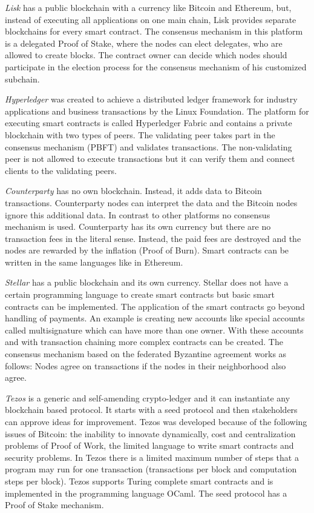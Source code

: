 \documentclass[conference]{IEEEtran}
\begin{document}
\textit{Lisk} has a public blockchain with a currency like Bitcoin and Ethereum, but, instead of executing all applications on one main chain, Lisk provides separate blockchains for every smart contract. The consensus mechanism in this platform is a delegated Proof of Stake, where the nodes can elect delegates, who are allowed to create blocks. The contract owner can decide which nodes should participate in the election process for the consensus mechanism of his customized subchain.  \cite{Bartoletti2017} \par 
\textit{Hyperledger} was created to achieve a distributed ledger framework for industry applications and business transactions by the Linux Foundation. The platform for executing smart contracts is called Hyperledger Fabric and contains a private blockchain with two types of peers. The validating peer takes part in the consensus mechanism (PBFT) and validates transactions. The non-validating peer is not allowed to execute transactions but it can verify them and connect clients to the validating peers. \cite{Cachin2016} \par 
\textit{Counterparty} has no own blockchain. Instead, it adds data to Bitcoin transactions. Counterparty nodes can interpret the data and the Bitcoin nodes ignore this additional data. In contrast to other platforms no consensus mechanism is used. Counterparty has its own currency but there are no transaction fees in the literal sense. Instead, the paid fees are destroyed and the nodes are rewarded by the inflation (Proof of Burn). Smart contracts can be written in the same languages like in Ethereum. \cite{Bartoletti2017} \par 
\textit{Stellar} has a public blockchain and its own currency. Stellar does not have a certain programming language to create smart contracts but basic smart contracts can be implemented. The application of the smart contracts go beyond handling of payments. An example is creating new accounts like special accounts called multisignature which can have more than one owner. With these accounts and with transaction chaining more complex contracts can be created. The consensus mechanism based on the federated Byzantine agreement works as follows: Nodes agree on transactions if the nodes in their neighborhood also agree. \cite{Bartoletti2017} \par 
\textit{Tezos} is a generic and self-amending crypto-ledger and it can instantiate any blockchain based protocol. It starts with a seed protocol and then stakeholders can approve ideas for improvement. Tezos was developed because of the following issues of Bitcoin: the inability to innovate dynamically, cost and centralization problems of Proof of Work, the limited language to write smart contracts and security problems. In Tezos there is a limited maximum number of steps that a program may run for one transaction (transactions per block and computation steps per block). Tezos supports Turing complete smart contracts and is implemented in the programming language OCaml. The seed protocol has a Proof of Stake mechanism. \cite{Goodman2014} \cite{Goodman2014a} \par
\end{document}
